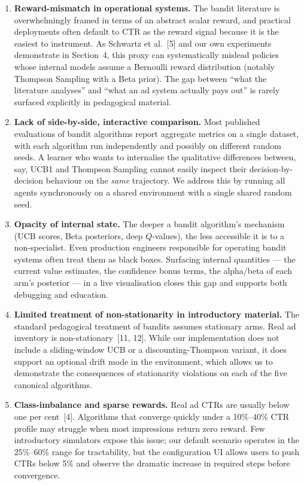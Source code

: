 \begin{enumerate}
\item \textbf{Reward-mismatch in operational systems.} The bandit literature is overwhelmingly framed in terms of an abstract scalar reward, and practical deployments often default to CTR as the reward signal because it is the easiest to instrument. As Schwartz et al.~[5] and our own experiments demonstrate in Section~4, this proxy can systematically mislead policies whose internal models assume a Bernoulli reward distribution (notably Thompson Sampling with a Beta prior). The gap between ``what the literature analyses'' and ``what an ad system actually pays out'' is rarely surfaced explicitly in pedagogical material.

\item \textbf{Lack of side-by-side, interactive comparison.} Most published evaluations of bandit algorithms report aggregate metrics on a single dataset, with each algorithm run independently and possibly on different random seeds. A learner who wants to internalise the qualitative differences between, say, UCB1 and Thompson Sampling cannot easily inspect their decision-by-decision behaviour on the \emph{same} trajectory. We address this by running all agents synchronously on a shared environment with a single shared random seed.

\item \textbf{Opacity of internal state.} The deeper a bandit algorithm's mechanism (UCB scores, Beta posteriors, deep $Q$-values), the less accessible it is to a non-specialist. Even production engineers responsible for operating bandit systems often treat them as black boxes. Surfacing internal quantities --- the current value estimates, the confidence bonus terms, the alpha/beta of each arm's posterior --- in a live visualisation closes this gap and supports both debugging and education.

\item \textbf{Limited treatment of non-stationarity in introductory material.} The standard pedagogical treatment of bandits assumes stationary arms. Real ad inventory is non-stationary~[11, 12]. While our implementation does not include a sliding-window UCB or a discounting-Thompson variant, it does support an optional drift mode in the environment, which allows us to demonstrate the consequences of stationarity violations on each of the five canonical algorithms.

\item \textbf{Class-imbalance and sparse rewards.} Real ad CTRs are usually below one per cent~[4]. Algorithms that converge quickly under a 10\%--40\% CTR profile may struggle when most impressions return zero reward. Few introductory simulators expose this issue; our default scenario operates in the 25\%--60\% range for tractability, but the configuration UI allows users to push CTRs below 5\% and observe the dramatic increase in required steps before convergence.


\end{enumerate}
